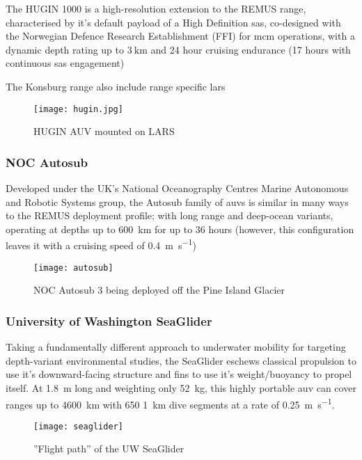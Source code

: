 The HUGIN 1000 is a high-resolution extension to the REMUS range, characterised by it's default payload of a High Definition \gls{sas}, co-designed with the Norwegian Defence Research Establishment (FFI) for \gls{mcm} operations, with a dynamic depth rating up to $\SI{3}{\kilo\meter}$ and 24 hour cruising endurance (17 hours with continuous \gls{sas} engagement)

The Konsburg range also include range specific \gls{lars}
\begin{figure}[h]
	\centering
	\texttt{[image: hugin.jpg]}
	\caption{\label{fig:hugin}HUGIN AUV mounted on LARS}
\end{figure}
\subsubsection{NOC Autosub}

Developed under the UK's National Oceanography Centres Marine Autonomous and Robotic Systems group, the Autosub family of \glspl{auv} is similar in many ways to the REMUS deployment profile; with long range and deep-ocean variants, operating at depths up to \SI{600}{\kilo\meter} for up to 36 hours (however, this configuration leaves it with a cruising speed of \SI{0.4}{\meter\per\second})
\begin{figure}[h]
	\centering
	\texttt{[image: autosub]}
	\caption{\label{fig:autosub}NOC Autosub 3 being deployed off the Pine Island Glacier}
\end{figure}

\subsubsection{University of Washington SeaGlider}
Taking a fundamentally different approach to underwater mobility for targeting depth-variant environmental studies, the SeaGlider eschews classical propulsion to use it's downward-facing structure and fins to use it's weight/buoyancy to propel itself.   
At \SI{1.8}{\meter} long and weighting only \SI{52}{\kilogram}, this highly portable \gls{auv} can cover ranges up to \SI{4600}{\kilo\meter} with 650 \SI{1}{\kilo\meter} dive segments at a rate of \SI{0.25}{\meter\per\second}.
\begin{figure}[h]
	\centering
	\texttt{[image: seaglider]}
	\caption{\label{fig:seaglider}''Flight path'' of the UW SeaGlider}
\end{figure}


